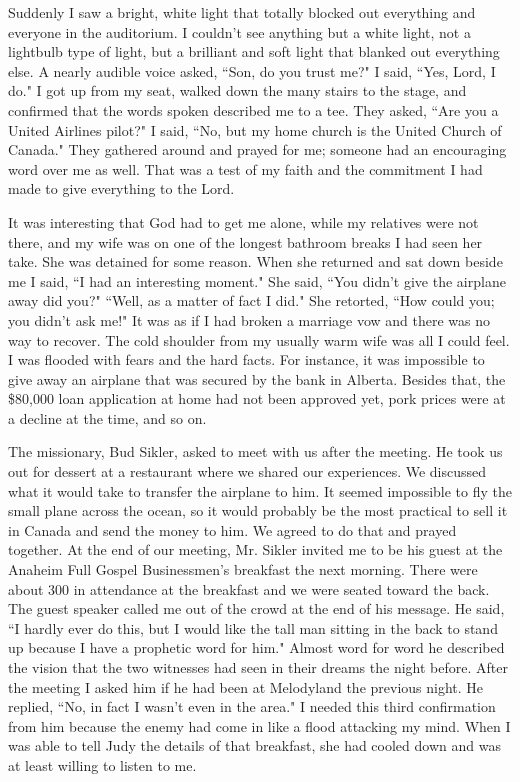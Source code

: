 \documentclass[oneside,12pt]{book}
\begin{document}
Suddenly I saw a bright, white light that totally blocked out everything and everyone in the auditorium. I couldn't see anything but a white light, not a lightbulb type of light, but a brilliant and soft light that blanked out everything else. A nearly audible voice asked, ``Son, do you trust me?" I said, ``Yes, Lord, I do." I got up from my seat, walked down the many stairs to the stage, and confirmed that the words spoken described me to a tee. They asked, ``Are you a United Airlines pilot?" I said, ``No, but my home church is the United Church of Canada." They gathered around and prayed for me; someone had an encouraging word over me as well. That was a test of my faith and the commitment I had made to give everything to the Lord.

It was interesting that God had to get me alone, while my relatives were not there, and my wife was on one of the longest bathroom breaks I had seen her take. She was detained for some reason. When she returned and sat down beside me I said, ``I had an interesting moment." She said, ``You didn't give the airplane away did you?" ``Well, as a matter of fact I did." She retorted, ``How could you; you didn't ask me!" It was as if I had broken a marriage vow and there was no way to recover. The cold shoulder from my usually warm wife was all I could feel. I was flooded with fears and the hard facts.  For instance, it was impossible to give away an airplane that was secured by the bank in Alberta. Besides that, the \$80,000 loan application at home had not been approved yet,  pork prices were at a decline at the time, and so on.

The missionary, Bud Sikler, asked to meet with us after the meeting. He took us out for dessert at a restaurant where we shared our experiences. We discussed what it would take to transfer the airplane to him. It seemed impossible to fly the small plane across the ocean, so it would probably be the most practical to sell it in Canada and send the money to him. We agreed to do that and prayed together. At the end of our meeting, Mr. Sikler invited me to be his guest at the Anaheim Full Gospel Businessmen's breakfast the next morning. There were about 300 in attendance at the breakfast and we were seated toward the back. The guest speaker called me out of the crowd at the end of his message. He said, ``I hardly ever do this, but I would like the tall man sitting in the back to stand up because I have a prophetic word for him." Almost word for word he described the vision that the two witnesses had seen in their dreams the night before. After the meeting I asked him if he had been at Melodyland the previous night. He replied, ``No, in fact I wasn't even in the area." I needed this third confirmation from him because the enemy had come in like a flood attacking my mind. When I was able to tell Judy the details of that breakfast, she had cooled down and was at least willing to listen to me.
\end{document}
